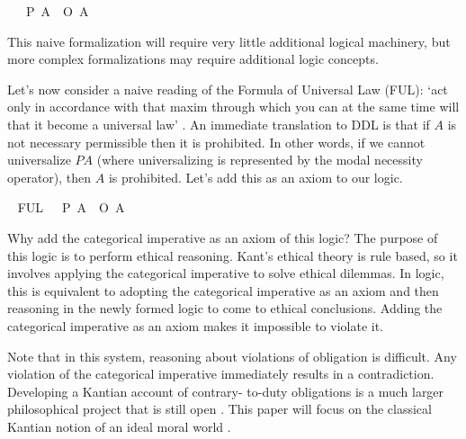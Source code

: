 \begin{isabellebody}
\ \ \ {\isachardoublequoteopen}{\isacharparenleft}P\ A{\isacharparenright}\ {\isasymequiv}\ {\isacharparenleft}\isactrlbold {\isasymnot}{\isacharparenleft}O\ {\isacharbraceleft}\isactrlbold {\isasymnot}A{\isacharbraceright}{\isacharparenright}{\isacharparenright}{\isachardoublequoteclose}\isanewline
%
%
\begin{isamarkuptext}%
This naive formalization will require very little additional logical machinery, but more complex
formalizations may require additional logic concepts. 

Let's now consider a naive reading of the Formula of Universal Law (FUL): `act only in accordance 
with that maxim through which you can at the same time will that it become a universal law' \cite{groundwork}.
An immediate translation to DDL is that if $A$ is not necessary permissible then it is prohibited. In other
words, if we cannot universalize $P A$ (where universalizing is represented by the modal necessity 
operator), then $A$ is prohibited. Let's add this as an axiom to our logic.%
\end{isamarkuptext}\isamarkuptrue%
\isamarkupfalse%
\ \isanewline
FUL{\isacharunderscore}{}{\isacharcolon}\ {\isachardoublequoteopen}{\isasymTurnstile}\ {\isacharparenleft}{\isacharparenleft}\isactrlbold {\isasymnot}{\isacharparenleft}{\isasymbox}\ {\isacharparenleft}P\ A{\isacharparenright}{\isacharparenright}{\isacharparenright}\ \isactrlbold {\isasymrightarrow}\ {\isacharparenleft}O\ {\isacharbraceleft}{\isacharparenleft}\isactrlbold {\isasymnot}A{\isacharparenright}{\isacharbraceright}{\isacharparenright}{\isacharparenright}{\isachardoublequoteclose}%
\begin{isamarkuptext}%
Why add the categorical imperative as an axiom of this logic? The purpose of this logic is to 
perform ethical reasoning. Kant's ethical theory is rule based, so it involves applying the categorical
imperative to solve ethical dilemmas. In logic, this is equivalent to adopting the categorical imperative as 
an axiom and then reasoning in the newly formed logic to come to ethical conclusions. Adding the categorical
imperative as an axiom makes it impossible to violate it. 

Note that in this system, reasoning about violations of obligation is difficult. Any violation of the 
categorical imperative immediately results in a contradiction. Developing a Kantian account of contrary-
to-duty obligations is a much larger philosophical project that is still open \cite{KorsgaardRTL}. This paper will focus 
on the classical Kantian notion of an ideal moral world \cite{idealtheory}.


\end{isamarkuptext}
\end{isabellebody}
